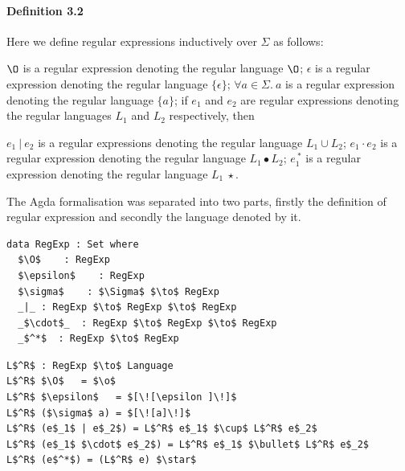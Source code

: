 \documentclass[twoside,openright,final]{bhamthesis}
\renewcommand{\item}{\itemindent0.5cm\itemold}
\begin{document}
\paragraph{Definition 3.2} Here we define regular expressions
inductively over
\(\Sigma\) as follows: 
\begin{enumerate}
  \item \(\O\) is a regular expression denoting the regular language \(\O\);
  \item \(\epsilon\) is a regular expression denoting the regular language \(\{\epsilon\}\);
  \item \(\forall a\in\Sigma.\ a\) is a regular expression denoting the regular language \(\{a\}\);
  \item if \(e_{1}\) and \(e_{2}\) are regular expressions denoting the regular
    languages \(L_1\) and \(L_2\) respectively, then
    \begin{enumerate}
      \item \(e_{1}\ |\ e_{2}\) is a regular expressions denoting the
        regular language \(L_1 \cup L_2\);
      \item \(e_{1}\cdot e_{2}\) is a regular expression denoting the
        regular language \(L_1\bullet L_2\);
      \item \(e_{1}^{\ *}\) is a regular expression denoting the regular
        language \(L_1\ \star\).
     \end{enumerate}
\end{enumerate}

\par The Agda formalisation was separated into two parts, firstly the
definition of regular expression and secondly the language denoted by
it.

\begin{lstlisting}[caption=Regular Expression,mathescape=true]
data RegExp : Set where
  $\O$    : RegExp
  $\epsilon$    : RegExp
  $\sigma$    : $\Sigma$ $\to$ RegExp
  _|_ : RegExp $\to$ RegExp $\to$ RegExp
  _$\cdot$_  : RegExp $\to$ RegExp $\to$ RegExp
  _$^*$  : RegExp $\to$ RegExp
\end{lstlisting} 

\begin{lstlisting}[caption=Language denoted by a regular expression,mathescape=true]
L$^R$ : RegExp $\to$ Language
L$^R$ $\O$   = $\o$
L$^R$ $\epsilon$   = $[\![\epsilon ]\!]$
L$^R$ ($\sigma$ a) = $[\![a]\!]$
L$^R$ (e$_1$ | e$_2$) = L$^R$ e$_1$ $\cup$ L$^R$ e$_2$
L$^R$ (e$_1$ $\cdot$ e$_2$) = L$^R$ e$_1$ $\bullet$ L$^R$ e$_2$
L$^R$ (e$^*$) = (L$^R$ e) $\star$
\end{lstlisting}
\end{document}
